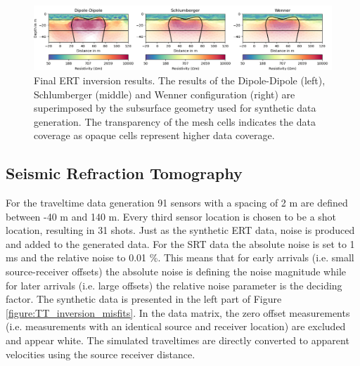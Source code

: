 \begin{figure}[H]
  \centering
    \includegraphics[width=\textwidth]{Figures/ERT_Inv_comp.png}
    \caption[Final resistivity models after inversion]{Final ERT inversion results. The results of the Dipole-Dipole (left), Schlumberger (middle) and Wenner configuration (right) are superimposed by the subsurface geometry used for synthetic data generation. The transparency of the mesh cells indicates the data coverage as opaque cells represent higher data coverage.}
    \label{figure:ERT_inversion_comp}
\end{figure}

\subsection{Seismic Refraction Tomography}\label{section:Res_TT}

For the traveltime data generation 91 sensors with a spacing of 2 m are defined between -40 m and 140 m. Every third sensor location is chosen to be a shot location, resulting in 31 shots. Just as the synthetic ERT data, noise is produced and added to the generated data. For the SRT data the absolute noise is set to 1 ms and the relative noise to 0.01 \%. This means that for early arrivals (i.e. small source-receiver offsets) the absolute noise is defining the noise magnitude while for later arrivals (i.e. large offsets) the relative noise parameter is the deciding factor. The synthetic data is presented in the left part of Figure \ref{figure:TT_inversion_misfits}. In the data matrix, the zero offset measurements (i.e. measurements with an identical source and receiver location) are excluded and appear white. The simulated traveltimes are directly converted to apparent velocities using the source receiver distance.

